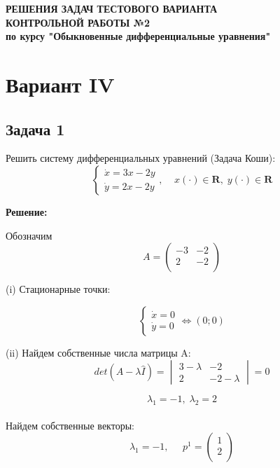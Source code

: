 \documentclass[a4paper, 12pt]{article}
\begin{document}
\begin{center}


\vfill






\textbf{РЕШЕНИЯ ЗАДАЧ ТЕСТОВОГО ВАРИАНТА\\[3mm]
КОНТРОЛЬНОЙ РАБОТЫ №2\\[3mm]
по курсу "Обыкновенные дифференциальные уравнения"
\\
}
\end{center}



	\section*{Вариант IV}
		\subsection* {Задача 1}


 Решить систему дифференциальных уравнений (Задача Коши): 
\begin{equation}
\left\{
\begin{array}{lr}
\dot{x} = 3x-2y\\
\dot{y} = 2x-2y
\end{array}
\right.
, \;\;\;\; x(\cdot)\in \textbf{R},\; y(\cdot)\in \textbf{R}
\label{eq:1}
\end{equation}

\textbf{Решение:} \par
Обозначим 
\[
A = \left(
\begin{array}{cc}
-3 & -2\\
2 & -2\\
\end{array}
\right)\]

(i) Стационарные точки:

\[
\left\{
\begin{array}{lr}
\dot{x} = 0\\
\dot{y} = 0
\end{array}
\right.
\Leftrightarrow (0;0)
\]


(ii) Найдем собственные числа матрицы A:
\[det(A-\lambda \hat{I})=
\begin{vmatrix}
3-\lambda & -2 \\
2 & -2-\lambda
\end{vmatrix}
=0\]

\[\lambda_1=-1, \; \lambda_2=2\]
\\Найдем собственные векторы:
\[\lambda_1=-1,\;\;\;\;\; p^1=
\left(
\begin{array}{cc}
1\\
2\\
\end{array}
\right)
\]
\end{document}
